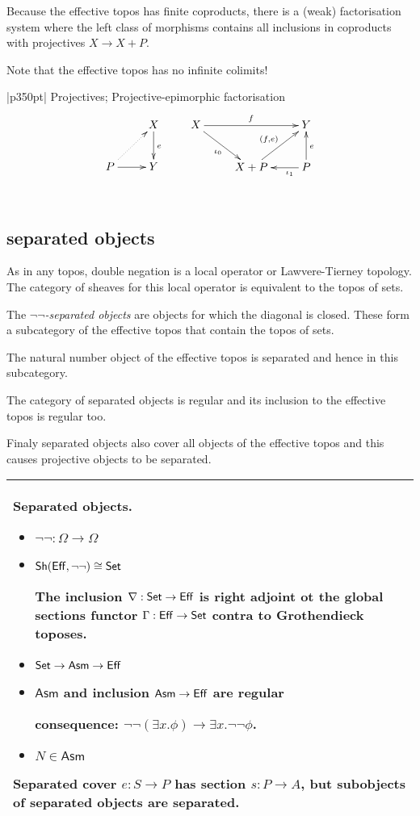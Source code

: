 \documentclass[12pt,a4paper]{article}
\theoremstyle{definition}
\newenvironment{blackboard}{\begin{tabular}{|p{350pt}|}\hline} {\\ \hline \end{tabular} }
\begin{document}
Because the effective topos has finite coproducts, there is a (weak) factorisation system where the left class of morphisms contains all inclusions in coproducts with projectives $X\to X+P$.

Note that the effective topos has no infinite colimits!

\begin{blackboard}
Projectives; Projective-epimorphic factorisation
\[ \xymatrix{
& X\ar[d]^e\\
P \ar@{.>}[ur]\ar[r] & Y
}\qquad\xymatrix{
X\ar[rr]^f\ar[dr]_{\iota_0} && Y \\
& X+P \ar[ur]^{(f,e)} & P\ar[u]_e\ar[l]^(.3){\iota_1}
}\]
\end{blackboard}

\subsection{separated objects}
As in any topos, double negation is a local operator or Lawvere-Tierney topology. The category of sheaves for this local operator is equivalent to the topos of sets. 

\newcommand\Asm{\mathsf{Asm}}
The \emph{$\neg\neg$-separated objects} are objects for which the diagonal is closed. These form a subcategory of the effective topos that contain the topos of sets.

The natural number object of the effective topos is separated and hence in this subcategory.

The category of separated objects is regular and its inclusion to the effective topos is regular too.

Finaly separated objects also cover all objects of the effective topos and this causes projective objects to be separated.

\begin{blackboard}
Separated objects.
\begin{itemize}
\item $\neg\neg:\Omega \to \Omega$ 
\item $\mathsf{Sh}(\mathsf{Eff},\neg\neg)\cong\mathsf{Set}$

The inclusion $\nabla:\mathsf{Set} \to \mathsf{Eff}$ is right adjoint ot the global sections functor $\Gamma:\mathsf{Eff} \to \mathsf{Set}$ contra to Grothendieck toposes.

\item $\Set \to \Asm \to \Eff$
\item $\Asm$ and inclusion $\Asm\to \Eff$ are regular

consequence: $\neg\neg(\exists x.\phi)\to \exists x.\neg\neg\phi$.

\item $N\in \Asm$
\end{itemize}

Separated cover $e:S \to P$ has section $s:P\to A$, but subobjects of separated objects are separated.
\end{blackboard}
\end{document}
